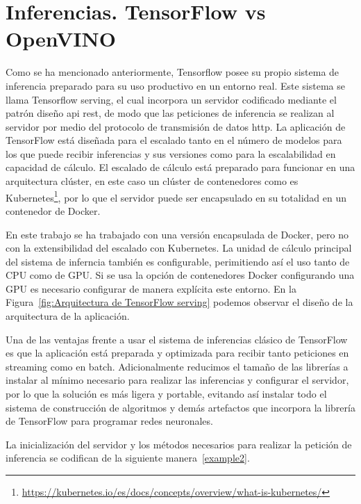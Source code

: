 \section{Inferencias. TensorFlow vs OpenVINO}\label{sec:inferencias.-Tensorflow-vs-OpenVINO}
Como se ha mencionado anteriormente, Tensorflow posee su propio sistema de inferencia preparado para su uso productivo en un entorno real. Este sistema se llama Tensorflow serving, el cual incorpora un servidor codificado mediante el patrón diseño api rest, de modo que las peticiones
de inferencia se realizan al servidor por medio del protocolo de transmisión de datos http.
La aplicación de TensorFlow está diseñada para el escalado tanto en el número de modelos para los que puede recibir inferencias y sus versiones como para la escalabilidad en capacidad de cálculo.
El escalado de cálculo está preparado para funcionar en una arquitectura clúster, en este caso un clúster de contenedores como es Kubernetes\footnote{\url{https://kubernetes.io/es/docs/concepts/overview/what-is-kubernetes/}}, por lo que el servidor puede ser encapsulado en su totalidad en un contenedor de Docker.

En este trabajo se ha trabajado con una versión encapsulada de Docker, pero no con la extensibilidad del escalado con Kubernetes\cite{kubernetes}.
La unidad de cálculo principal del sistema de inferncia también es configurable, perimitiendo así el uso tanto de CPU como de GPU.
Si se usa la opción de contenedores Docker configurando una GPU es necesario configurar de manera explícita este entorno.
En la Figura~\ref{fig:Arquitectura de TensorFlow serving} podemos observar el diseño de la arquitectura de la aplicación.

Una de las ventajas frente a usar el sistema de inferencias clásico de TensorFlow es que la aplicación está preparada y optimizada para recibir tanto peticiones en streaming como en batch.
Adicionalmente reducimos el tamaño de las librerías a instalar al mínimo necesario para realizar las inferencias y configurar el servidor, por lo que la solución es más ligera y portable, evitando así
instalar todo el sistema de construcción de algoritmos y demás artefactos que incorpora la librería de TensorFlow para programar redes neuronales.

La inicialización del servidor y los métodos necesarios para realizar la petición de inferencia se codifican de la siguiente manera~\ref{example2}.

